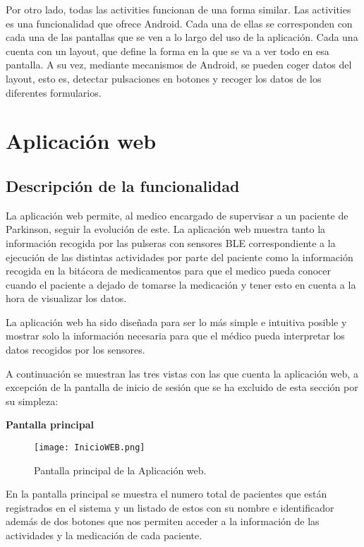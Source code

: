Por otro lado, todas las activities funcionan de una forma similar. Las activities es una funcionalidad que ofrece Android. Cada una de ellas se corresponden con cada una de las pantallas que se ven a lo largo del uso de la aplicación. Cada una cuenta con un layout, que define la forma en la que se va a ver todo en esa pantalla. A su vez, mediante mecanismos de Android, se pueden coger datos del layout, esto es, detectar pulsaciones en botones y recoger los datos de los diferentes formularios.
\newpage

\newpage
\section{Aplicación web}
\subsection{Descripción de la funcionalidad}
La aplicación web permite, al medico encargado de supervisar a un paciente de Parkinson, seguir la evolución de este. La aplicación web muestra tanto la información recogida por las pulseras con sensores BLE correspondiente a la ejecución de las distintas actividades por parte del paciente como la información recogida en la bitácora de medicamentos para que el medico pueda conocer cuando el paciente a dejado de tomarse la medicación y tener esto en cuenta a la hora de visualizar los datos.
\newline

La aplicación web ha sido diseñada para ser lo más simple e intuitiva posible y mostrar solo la información necesaria para que el médico pueda interpretar los datos recogidos por los sensores.
\newline

A continuación se muestran las tres vistas con las que cuenta la aplicación web, a excepción de la pantalla de inicio de sesión que se ha excluido de esta sección por su simpleza:
\newline

\textbf{Pantalla principal}
\newline

\begin{figure}[H]
  \centering
  \texttt{[image: InicioWEB.png]}
  \caption{Pantalla principal de la Aplicación web.}
\end{figure}

En la pantalla principal se muestra el numero total de pacientes que están registrados en el sistema y un listado de estos con su nombre e identificador además de dos botones que nos permiten acceder a la información de las actividades y la medicación de cada paciente.
\newline
\newline

